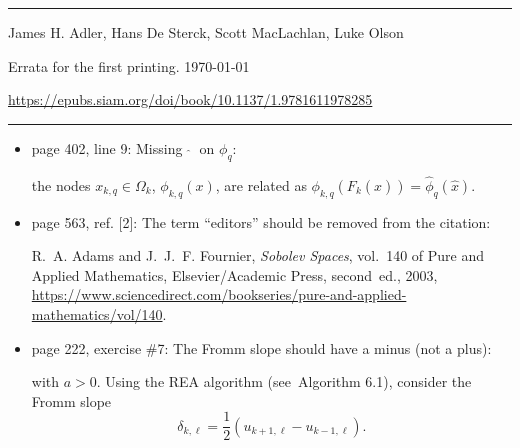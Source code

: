 \documentclass[mytheorems]{SIAMbook2019}
\newcommand{\erratafix}[1]{\medskip\newline\colorbox{latexgray}{\begin{minipage}[t]{0.90\textwidth}#1\end{minipage}}}
\begin{document}
\thispagestyle{empty}
\par\noindent\hfill\rule{\textwidth}{0.5pt}

\medskip
{}\newline
\noindent James H. Adler, Hans De Sterck, Scott MacLachlan, Luke Olson
\medskip

\noindent Errata for the first printing. \today

\medskip
\noindent \url{https://epubs.siam.org/doi/book/10.1137/1.9781611978285}

\par\noindent\hfill\rule{\textwidth}{0.5pt}

\medskip

\begin{itemize}[itemsep=10pt]
  \item  \textcolor{tab-red}{page 402, line 9:} Missing $\;\widehat{}\;$ on $\phi_q$:
    \erratafix{
    the nodes $x_{k,q}\in\Omega_k$, $\phi_{k,q}(x)$, are related as $\phi_{k,q}(F_k(\widehat{x})) = \widehat{\phi}_q(\widehat{x})$.
  }

\item \textcolor{tab-red}{page 563, ref. [2]:} The term ``editors'' should be removed from the citation:
    \erratafix{
      {\sc R.~A. Adams and J.~J.~F. Fournier}, {\em Sobolev Spaces}, vol.~140 of Pure and Applied Mathematics, Elsevier/Academic Press, second~ed., 2003, \url{https://www.sciencedirect.com/bookseries/pure-and-applied-mathematics/vol/140}.
    }

  \item \textcolor{tab-red}{page 222, exercise \#7:} The Fromm slope should have a minus (not a plus):
    \erratafix{
    with $a > 0$.  Using the REA algorithm (see~Algorithm 6.1), consider the Fromm slope
      \begin{equation*}
      \delta_{k,\ell} = \frac{1}{2}(u_{k+1,\ell} - u_{k-1,\ell}).
      \end{equation*}
      }

\end{itemize}
\end{document}
